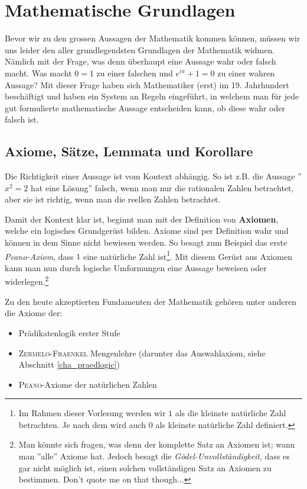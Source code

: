 \chapter{Mathematische Grundlagen}

Bevor wir zu den grossen Aussagen der Mathematik kommen können, müssen wir uns leider den aller grundlegendsten Grundlagen der Mathematik widmen. Nämlich mit der Frage, was denn überhaupt eine Aussage wahr oder falsch macht. Was macht $0=1$ zu einer falschen und $e^{i\pi} + 1 = 0$ zu einer wahren Aussage? Mit dieser Frage haben sich Mathematiker (erst) im 19. Jahrhundert beschäftigt und haben ein System an Regeln eingeführt, in welchem man für jede gut formulierte mathematische Aussage entscheiden kann, ob diese wahr oder falsch ist.

\section{Axiome, Sätze, Lemmata  und Korollare}
Die Richtigkeit einer Aussage ist vom Kontext abhängig. So ist z.B. die Aussage ''$x^2 = 2$ hat eine Lösung'' falsch, wenn man nur die rationalen Zahlen betrachtet, aber sie ist richtig, wenn man die reellen Zahlen betrachtet.

Damit der Kontext klar ist, beginnt man mit der Definition von \textbf{Axiomen}, welche ein logisches Grundgerüst bilden. Axiome sind per Definition wahr und können in dem Sinne nicht bewiesen werden. So besagt zum Beispiel das erste \textit{Peano-Axiom}, dass $1$ eine natürliche Zahl ist\footnote{Im Rahmen dieser Vorlesung werden wir $1$ als die kleinste natürliche Zahl betrachten. Je nach dem wird auch $0$ als kleinste natürliche Zahl definiert.}. Mit diesem Gerüst aus Axiomen kann man nun durch logische Umformungen eine Aussage beweisen oder widerlegen.\footnote{Man könnte sich fragen, was denn der komplette Satz an Axiomen ist; wann man ''alle'' Axiome hat. Jedoch besagt die \textit{Gödel-Unvollständigkeit}, dass es gar nicht möglich ist, einen solchen vollständigen Satz an Axiomen zu bestimmen. Don't quote me on that though...} 

Zu den heute akzeptierten Fundamenten der Mathematik gehören unter anderen die Axiome der:
\begin{itemize}
    \item Prädikatenlogik erster Stufe
    \item \textsc{Zermelo-Fraenkel} Mengenlehre (darunter das Auswahlaxiom, siehe Abschnitt \ref{cha_praedlogic})
    \item \textsc{Peano}-Axiome der natürlichen Zahlen
\end{itemize}


